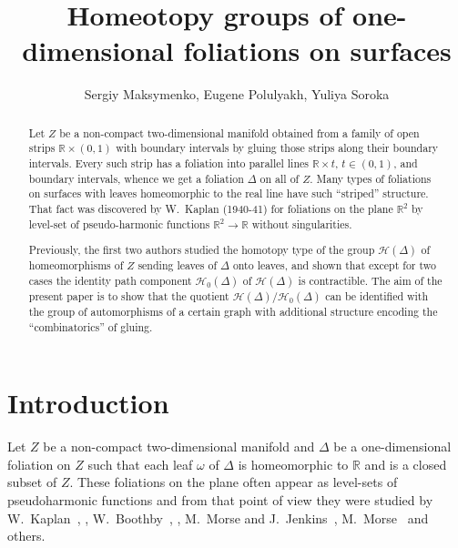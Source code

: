 \documentclass[12pt, reqno]{amsart}
\newcommand{\bR}{\mathbb{R}}
\newcommand{\Partition}{\Delta}
\newcommand{\stripSurf}{Z}
\begin{document}
\author{Sergiy Maksymenko, Eugene Polulyakh, Yuliya Soroka}

\title{Homeotopy groups of one-dimensional foliations on surfaces}

\begin{abstract}
Let $Z$ be a non-compact two-dimensional manifold obtained from a family of open strips $\mathbb{R}\times(0,1)$ with boundary intervals by gluing those strips along their boundary intervals.
Every such strip has a foliation into parallel lines $\mathbb{R}\times t$, $t\in(0,1)$, and boundary intervals, whence we get a foliation $\Delta$ on all of $Z$.
Many types of foliations on surfaces with leaves homeomorphic to the real line have such ``striped'' structure.
That fact was discovered by W.~Kaplan (1940-41) for foliations on the plane $\mathbb{R}^2$ by level-set of pseudo-harmonic functions $\mathbb{R}^2 \to \mathbb{R}$ without singularities.

Previously, the first two authors studied the homotopy type of the group $\mathcal{H}(\Delta)$ of homeomorphisms of $Z$ sending leaves of $\Delta$ onto leaves, and shown that except for two cases the identity path component $\mathcal{H}_{0}(\Delta)$ of $\mathcal{H}(\Delta)$ is contractible.
The aim of the present paper is to show that the quotient $\mathcal{H}(\Delta)/ \mathcal{H}_{0}(\Delta)$ can be identified with the group of automorphisms of a certain graph with additional structure encoding the ``combinatorics'' of gluing.
\end{abstract}


\maketitle

\section{Introduction}

Let $\stripSurf$ be a non-compact two-dimensional manifold and $\Partition$ be a one-dimensional foliation on $\stripSurf$ such that each leaf $\omega$ of $\Partition$ is homeomorphic to $\bR$ and is a closed subset of $\stripSurf$.
These foliations on the plane often appear as level-sets of pseudoharmonic functions and from that point of view they were studied by W.~Kaplan~\cite{Kaplan:DJM:1940}, \cite{Kaplan:DJM:1941}, W.~Boothby~\cite{Boothby:AJM_1:1951}, \cite{Boothby:AJM_2:1951}, M.~Morse and J.~Jenkins~\cite{JenkinsMorse:AJM:1952}, M.~Morse~\cite{Morse:FM:1952} and others.
\end{document}
